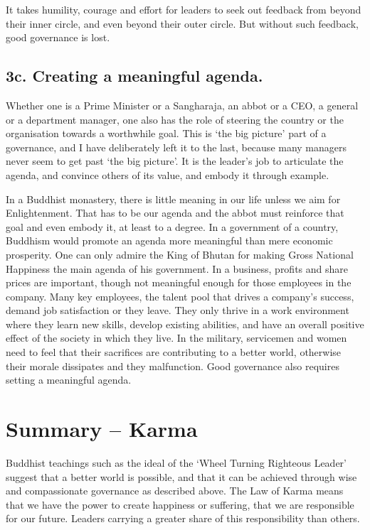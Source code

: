 \documentclass[12pt, openany]{book}
\begin{document}
It takes humility, courage and effort for leaders to seek out feedback from beyond their inner circle, and even beyond their outer circle. But without such feedback, good governance is lost.

\section{3c. Creating a meaningful agenda.}

Whether one is a Prime Minister or a Sangharaja, an abbot or a CEO, a general or a department manager, one also has the role of steering the country or the organisation towards a worthwhile goal. This is ‘the big picture’ part of a governance, and I have deliberately left it to the last, because many managers never seem to get past ‘the big picture’. It is the leader’s job to articulate the agenda, and convince others of its value, and embody it through example.

In a Buddhist monastery, there is little meaning in our life unless we aim for Enlightenment. That has to be our agenda and the abbot must reinforce that goal and even embody it, at least to a degree. In a government of a country, Buddhism would promote an agenda more meaningful than mere economic prosperity. One can only admire the King of Bhutan for making Gross National Happiness the main agenda of his government. In a business, profits and share prices are important, though not meaningful enough for those employees in the company. Many key employees, the talent pool that drives a company’s success, demand job satisfaction or they leave. They only thrive in a work environment where they learn new skills, develop existing abilities, and have an overall positive effect of the society in which they live. In the military, servicemen and women need to feel that their sacrifices are contributing to a better world, otherwise their morale dissipates and they malfunction. Good governance also requires setting a meaningful agenda.

\chapter{Summary – Karma}

Buddhist teachings such as the ideal of the ‘Wheel Turning Righteous Leader’ suggest that a better world is possible, and that it can be achieved through wise and compassionate governance as described above. The Law of Karma means that we have the power to create happiness or suffering, that we are responsible for our future. Leaders carrying a greater share of this responsibility than others.
\end{document}
